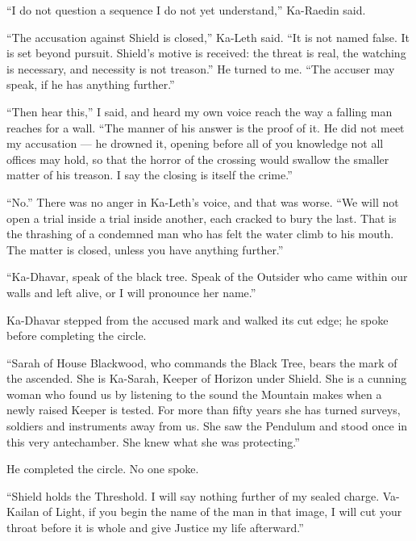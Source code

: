 ``I do not question a sequence I do not yet understand,'' Ka-Raedin said.\par

``The accusation against Shield is closed,'' Ka-Leth said. ``It is not named false. It is set beyond pursuit. Shield's motive is received: the threat is real, the watching is necessary, and necessity is not treason.'' He turned to me. ``The accuser may speak, if he has anything further.''\par

``Then hear this,'' I said, and heard my own voice reach the way a falling man reaches for a wall. ``The manner of his answer is the proof of it. He did not meet my accusation --- he drowned it, opening before all of you knowledge not all offices may hold, so that the horror of the crossing would swallow the smaller matter of his treason. I say the closing is itself the crime.''\par

``No.'' There was no anger in Ka-Leth's voice, and that was worse. ``We will not open a trial inside a trial inside another, each cracked to bury the last. That is the thrashing of a condemned man who has felt the water climb to his mouth. The matter is closed, unless you have anything further.''\par

``Ka-Dhavar, speak of the black tree. Speak of the Outsider who came within our walls and left alive, or I will pronounce her name.''\par

Ka-Dhavar stepped from the accused mark and walked its cut edge; he spoke before completing the circle.\par

``Sarah of House Blackwood, who commands the Black Tree, bears the mark of the ascended. She is Ka-Sarah, Keeper of Horizon under Shield. She is a cunning woman who found us by listening to the sound the Mountain makes when a newly raised Keeper is tested. For more than fifty years she has turned surveys, soldiers and instruments away from us. She saw the Pendulum and stood once in this very antechamber. She knew what she was protecting.''\par

He completed the circle. No one spoke.\par

``Shield holds the Threshold. I will say nothing further of my sealed charge. Va-Kailan of Light, if you begin the name of the man in that image, I will cut your throat before it is whole and give Justice my life afterward.''\par

